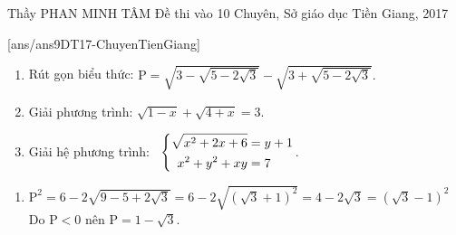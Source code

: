 \begin{name}
{Thầy  PHAN MINH TÂM}
{Đề thi vào 10 Chuyên, Sở giáo dục Tiền Giang, 2017}
\end{name}
\setcounter{ex}{0}
[ans/ans9DT17-ChuyenTienGiang]
\begin{ex}%
    \hfill
    \begin{enumerate}
        \item Rút gọn biểu thức: $ \mathrm{P} = \sqrt{3- \sqrt{5-2 \sqrt{3}}} - \sqrt{3+ \sqrt{5-2 \sqrt{3}}}. $
        \item Giải phương trình: $ \sqrt{1-x} + \sqrt{4+x} = 3. $
        \item Giải hệ phương trình: \, $\left\{\begin{aligned} \sqrt{x^2+2x+6} &=y + 1\\ x^2 + y^2 + xy &=7\end{aligned}\right.$.\\
    \end{enumerate}
\loigiai
    {
    \begin{enumerate}
        \item $ \mathrm{P}^2 = 6 - 2 \sqrt{9 - 5 + 2 \sqrt{3}} = 6 - 2 \sqrt{\left( \sqrt{3}+1\right)^2} = 4 - 2 \sqrt{3} = \left( \sqrt{3} - 1\right)^2 $ \\
        Do $ \mathrm{P} < 0 $ nên $ \mathrm{P} = 1 - \sqrt{3}.$
        

\end{enumerate}}
\end{ex}
